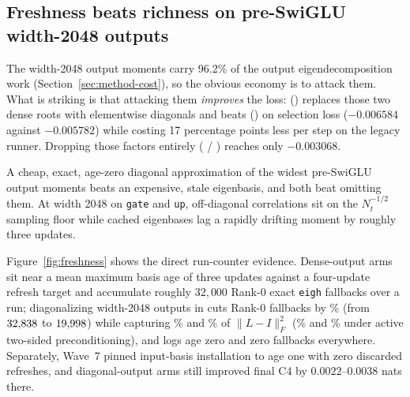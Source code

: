 \subsection{Freshness beats richness on pre-SwiGLU width-2048 outputs}
\label{sec:freshness}

The width-2048 output moments carry 96.2\% of the output eigendecomposition work
(Section~\ref{sec:method-cost}), so the obvious economy is to attack them. What
is striking is that attacking them \emph{improves} the loss: 
(\mlpdiag{}) replaces those two dense roots with elementwise diagonals and beats
 (\dense{}) on selection loss ($-0.006584$ against $-0.005782$)
while costing 17 percentage points less per step on the legacy runner. Dropping
those factors entirely ( / \noexp{}) reaches only $-0.003068$.

\begin{finding}
A cheap, exact, age-zero diagonal approximation of the widest pre-SwiGLU output
moments beats an expensive, stale eigenbasis, and both beat omitting them. At
width 2048 on \texttt{gate} and \texttt{up}, off-diagonal correlations sit on
the $N_t^{-1/2}$ sampling floor while cached eigenbases lag a rapidly drifting
moment by roughly three updates.
\end{finding}

Figure~\ref{fig:freshness} shows the direct run-counter evidence. Dense-output
arms sit near a mean maximum basis age of three updates against a four-update
refresh target and accumulate roughly $32{,}000$ Rank-0 exact \texttt{eigh}
fallbacks over a run; diagonalizing width-2048 outputs in  cuts
Rank-0 fallbacks by \motFbMlpdiagDropPct\% (from $32{,}838$ to
$19{,}998$) while capturing \motOutGateExpVarLMedPct\% and
\motOutUpExpVarLMedPct\% of $\|L - I\|_F^2$ (\mechOutGateExpVarLPct\% and
\mechOutUpExpVarLPct\% under active two-sided preconditioning), and
 logs age zero and zero fallbacks everywhere. Separately, Wave~7
pinned input-basis installation to age one with zero discarded refreshes, and
diagonal-output arms still improved final C4 by $0.0022$--$0.0038$ nats there.


